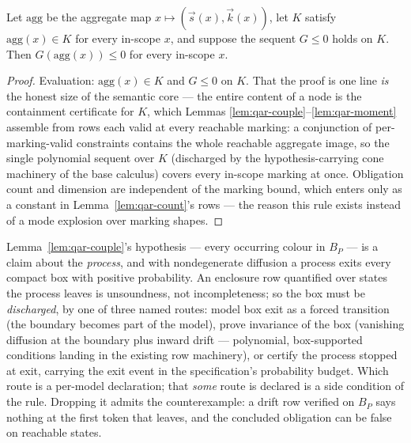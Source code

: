 \begin{bthm}\label{thm:qar-sound}
Let $\mathrm{agg}$ be the aggregate map
$x \mapsto (\vec{s}(x), \vec{k}(x))$, let
$K$ satisfy $\mathrm{agg}(x) \in K$ for every in-scope $x$, and suppose
the sequent $G \leq 0$ holds on $K$. Then
$G(\mathrm{agg}(x)) \leq 0$ for every in-scope $x$.
\end{bthm}
\begin{proof}
Evaluation: $\mathrm{agg}(x) \in K$ and $G \leq 0$ on $K$. That the
proof is one line \emph{is} the honest size of the semantic core ---
the entire content of a  node is the containment
certificate for $K$, which Lemmas
\ref{lem:qar-couple}--\ref{lem:qar-moment} assemble from rows each
valid at every reachable marking: a conjunction of per-marking-valid
constraints contains the whole reachable aggregate image, so the single
polynomial sequent over $K$ (discharged by the hypothesis-carrying
cone machinery of the base calculus) covers every in-scope marking at
once. Obligation count and dimension are independent of the marking
bound, which enters only as a constant in Lemma~\ref{lem:qar-count}'s
rows --- the reason this rule exists instead of a mode explosion over
marking shapes.
\end{proof}

\begin{bremark}\label{rem:qar-box}
Lemma~\ref{lem:qar-couple}'s hypothesis --- every occurring colour in
$B_P$ --- is a claim about the \emph{process}, and with nondegenerate
diffusion a process exits every compact box with positive probability.
An enclosure row quantified over states the process leaves is
unsoundness, not incompleteness; so the box must be \emph{discharged},
by one of three named routes: model box exit as a forced transition
(the boundary becomes part of the model), prove invariance of the box
(vanishing diffusion at the boundary plus inward drift --- polynomial,
box-supported conditions landing in the existing row machinery), or
certify the process stopped at exit, carrying the exit event in the
specification's probability budget. Which route is a per-model
declaration; that \emph{some} route is declared is a side condition of
the rule. Dropping it admits the counterexample: a drift row verified
on $B_P$ says nothing at the first token that leaves, and the
concluded obligation can be false on reachable states.
\end{bremark}

